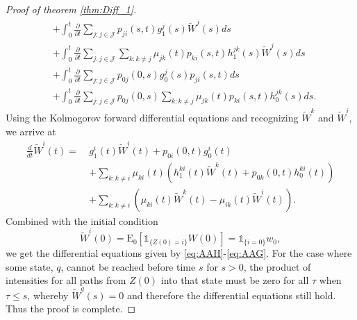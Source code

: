 \documentclass[12pt]{article}
\newcommand{\E}{\text{E}}
\newcommand{\indic}[1]{\mathds{1}_{ \{ #1 \} }}
\theoremstyle{my_thm}
\theoremstyle{my_rem}
\begin{document}
\begin{proof}[Proof of theorem \ref{thm:Diff_1}]
\begin{align*}
&+
\int_0^t \frac{\partial}{\partial t}  \sum_{j:j \in \mathcal{J}} p_{ji}(s,t) g_1^j(s) \tilde{W}^j(s)  ds
\\
&+
\int_0^t \frac{\partial}{\partial t}  \sum_{j:j \in \mathcal{J}} \sum_{k:k \neq j}  \mu_{jk}(t) p_{ki}(s,t)  h^{jk}_1(s) \tilde{W}^j(s)   ds
\\
&+
\int_0^t \frac{\partial}{\partial t}  \sum_{j:j \in \mathcal{J}} p_{0j}(0,s)g_0^j(s)p_{ji}(s,t) ds
\\
&+
\int_0^t \frac{\partial}{\partial t} \sum_{j:j \in \mathcal{J}} p_{0j}(0,s)  \sum_{k:k \neq j}  \mu_{jk}(t) p_{ki}(s,t)h_0^{jk}(s) ds.
\end{align*}
Using the Kolmogorov forward differential equations and recognizing $\tilde{W}^k$ and $\tilde{W}^i$, we arrive at
\begin{align*}
\frac{d}{dt}\tilde{W}^i(t)= \ &
g^i_1(t) \tilde{W}^i(t) +p_{0i}(0,t)g^i_0(t)\\
&+
\sum_{k:k \neq i} \mu_{ki}(t) \left(   h^{ki}_1(t) \tilde{W}^k(t) + p_{0k}(0,t)h^{ki}_0(t) \right)
\\
&+
\sum_{k:k \neq i}\left( \mu_{ki}(t) \tilde{W}^k(t)-\mu_{ik}(t)\tilde{W}^i(t)\right).
\end{align*}
Combined with the initial condition
$$
\tilde{W}^i(0)=\E_0[\indic{Z(0)=i}W(0)]=\indic{i=0}w_0,
$$
we get the differential equations given by \eqref{eq:AAH}-\eqref{eq:AAG}. For the case where some state, $q$, cannot be reached before time $s$ for $s>0$, the product of intensities for all paths from $Z(0)$ into that state must be zero for all $\tau$ when $\tau \leq s$, whereby $\tilde{W}^q(s)=0$ and therefore the differential equations still hold. Thus the proof is complete.
\end{proof}

\iffalse
\end{document}

